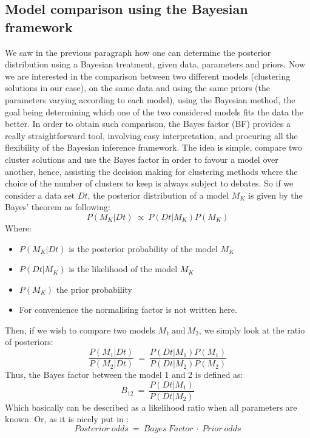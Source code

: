 \documentclass[twocolumn]{article}
\begin{document}
\subsection{Model comparison using the Bayesian framework}

We saw in the previous paragraph how one can determine the posterior distribution using a Bayesian treatment, given data, parameters and priors.
Now we are interested in the comparison between two different models (clustering solutions in our case), on the same data and using the same priors (the parameters varying according to each model), using the Bayesian method, the goal being determining which one of the two considered models fits the data the better.
In order to obtain such comparison, the Bayes factor (BF) provides a really straightforward tool\cite{raftery}, involving easy interpretation, and procuring all the flexibility of the Bayesian inference framework.
The idea is simple, compare two cluster solutions and use the Bayes factor in order to favour a model over another, hence, assisting the decision making for clustering methods where the choice of the number of clusters to keep is always subject to debates.
So if we consider a data set $Dt$, the posterior distribution of a model $M_K$ is given by the Bayes' theorem as following:
\begin{equation}
    P(M_K|Dt)\ \propto\ P(Dt|M_K)P(M_K) 
\end{equation}
Where:
\begin{itemize}
    \item $P(M_K|Dt)$ is the posterior probability of the model $M_K$
    \item $P(Dt|M_K)$ is the likelihood of the model $M_K$
    \item $P(M_K)$ the prior probability
    \item For convenience the normalising factor is not written here.
\end{itemize}
Then, if we wish to compare two models $M_1\ \text{and}\ M_2$, we simply look at the ratio of posteriors:
\begin{equation}
    \frac{P(M_1|Dt)}{P(M_2|Dt)}\ =\ \frac{P(Dt|M_1)P(M_1)}{P(Dt|M_2)P(M_2)}
    \label{equ:BayesRatio}
\end{equation}
Thus, the Bayes factor between the model 1 and 2 is defined as:
\begin{equation}
    B_{12}\ =\ \frac{P(Dt|M_1)}{P(Dt|M_2)}
\end{equation}
Which basically can be described as a likelihood ratio when all parameters are known.
Or, as it is nicely put in \cite{raftery}:\\
$$Posterior\ odds\ =\ Bayes\ Factor\ \cdot\ Prior\ odds$$
\end{document}
